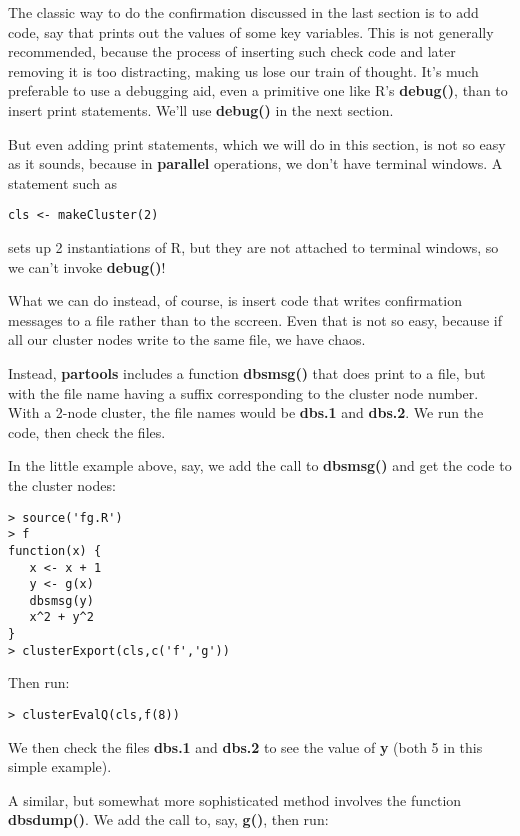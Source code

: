 \documentclass[11pt]{article}\usepackage[]{graphicx}\usepackage[]{color}
\begin{document}
The classic way to do the confirmation discussed in the last section is
to add code, say that prints out the values of some key variables. This
is not generally recommended, because the process of inserting such
check code and later removing it is too distracting, making us lose our
train of thought.  It's much preferable to use a debugging aid, even a
primitive one like R's {\bf debug()}, than to insert print statements.
We'll use {\bf debug()} in the next section.

But even adding print statements, which we will do in this section, is
not so easy as it sounds, because in {\bf parallel} operations, we don't
have terminal windows.  A statement such as

\begin{verbatim}
cls <- makeCluster(2)
\end{verbatim}

sets up 2 instantiations of R, but they are not attached to terminal
windows, so we can't invoke {\bf debug()}!

What we can do instead, of course, is insert code that writes
confirmation messages to a file rather than to the sccreen.  Even that
is not so easy, because if all our cluster nodes write to the same file,
we have chaos.

Instead, {\bf partools} includes a function {\bf dbsmsg()} that does
print to a file, but with the file name having a suffix corresponding to
the cluster node number.  With a 2-node cluster, the file names would be
{\bf dbs.1} and {\bf dbs.2}.  We run the code, then check the files.

In the little example above, say, we add the call to {\bf dbsmsg()} and
get the code to the cluster nodes:

\begin{verbatim}
> source('fg.R')
> f
function(x) {
   x <- x + 1
   y <- g(x)
   dbsmsg(y)
   x^2 + y^2
}
> clusterExport(cls,c('f','g'))
\end{verbatim}

Then run:

\begin{verbatim}
> clusterEvalQ(cls,f(8))
\end{verbatim}

We then check the files {\bf dbs.1} and {\bf dbs.2} to see the value of
{\bf y} (both 5 in this simple example).

A similar, but somewhat more sophisticated method involves the function
{\bf dbsdump()}.  We add the call to, say, {\bf g()}, then run:
\end{document}
